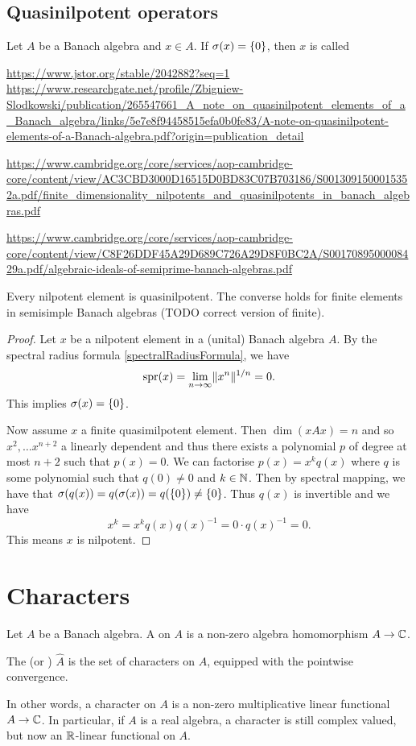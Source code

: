 \subsection{Quasinilpotent operators}
\begin{definition}
Let $A$ be a Banach algebra and $x\in A$. If $\sigma(x) = \{0\}$, then $x$ is called 
\end{definition}
\url{https://www.jstor.org/stable/2042882?seq=1}
\url{https://www.researchgate.net/profile/Zbigniew-Slodkowski/publication/265547661_A_note_on_quasinilpotent_elements_of_a_Banach_algebra/links/5e7e8f94458515efa0b0fe83/A-note-on-quasinilpotent-elements-of-a-Banach-algebra.pdf?origin=publication_detail}

\url{https://www.cambridge.org/core/services/aop-cambridge-core/content/view/AC3CBD3000D16515D0BD83C07B703186/S0013091500015352a.pdf/finite_dimensionality_nilpotents_and_quasinilpotents_in_banach_algebras.pdf}

\url{https://www.cambridge.org/core/services/aop-cambridge-core/content/view/C8F26DDF45A29D689C726A29D8F0BC2A/S0017089500008429a.pdf/algebraic-ideals-of-semiprime-banach-algebras.pdf}

\begin{proposition} \label{nilpotentQuasinilpotent}
Every nilpotent element is quasinilpotent. The converse holds for finite elements in semisimple Banach algebras (TODO correct version of finite).
\end{proposition}
\begin{proof}
Let $x$ be a nilpotent element in a (unital) Banach algebra $A$.
By the spectral radius formula \ref{spectralRadiusFormula}, we have
\[ \operatorname{spr}(x) = \lim_{n\to\infty}\lVert x^n\rVert^{1/n} = 0. \]
This implies $\sigma(x) = \{0\}$.

Now assume $x$ a finite quasimilpotent element. Then $\dim(xAx) = n$ and so $x^2, \ldots x^{n+2}$ a linearly dependent and thus there exists a polynomial $p$ of degree at most $n+2$ such that $p(x) = 0$. We can factorise $p(x) = x^kq(x)$ where $q$ is some polynomial such that $q(0) \neq 0$ and $k\in \mathbb{N}$. Then by spectral mapping, we have that $\sigma(q(x)) = q(\sigma(x)) = q(\{0\}) \neq \{0\}$. Thus $q(x)$ is invertible and we have
\[ x^k = x^kq(x)q(x)^{-1} = 0\cdot q(x)^{-1} = 0. \]
This means $x$ is nilpotent.
\end{proof}

\section{Characters}
\begin{definition}
Let $A$ be a Banach algebra. A  on $A$ is a non-zero algebra homomorphism $A\to\mathbb{C}$.

The  (or ) $\hat{A}$ is the set of characters on $A$, equipped with the pointwise convergence.
\end{definition}
In other words, a character on $A$ is a non-zero multiplicative linear functional $A\to \mathbb{C}$.
In particular, if $A$ is a real algebra, a character is still complex valued, but now  an $\mathbb{R}$-linear functional on $A$. 

